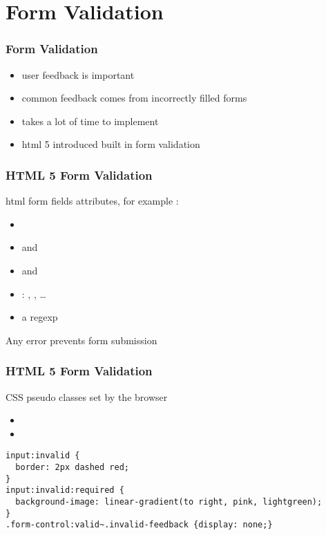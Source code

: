 \section{Form Validation}
\begin{frame}[fragile] \frametitle{Form Validation}
\begin{itemize}
  \item user feedback is important
  \item common feedback comes from incorrectly filled forms
  \item takes a lot of time to implement
  \item html 5 introduced built in form validation
\end{itemize}
\end{frame}

\begin{frame}[fragile] \frametitle{HTML 5 Form Validation}
html form fields attributes, for example :
\begin{itemize}
  \item {}
  \item {} and 
  \item {} and 
  \item {}: , , \ldots
  \item {} a regexp
\end{itemize}
\vspace{3mm}
Any error prevents form submission
\end{frame}

\begin{frame}[fragile] \frametitle{HTML 5 Form Validation}
CSS pseudo classes set by the browser
\begin{itemize}
  \item {}
  \item {}
\end{itemize}
\vspace{3mm}
\begin{lstlisting}[style=htmlcssjs]
input:invalid {
  border: 2px dashed red;
}
input:invalid:required {
  background-image: linear-gradient(to right, pink, lightgreen);
}
.form-control:valid~.invalid-feedback {display: none;}
\end{lstlisting}
\end{frame}

